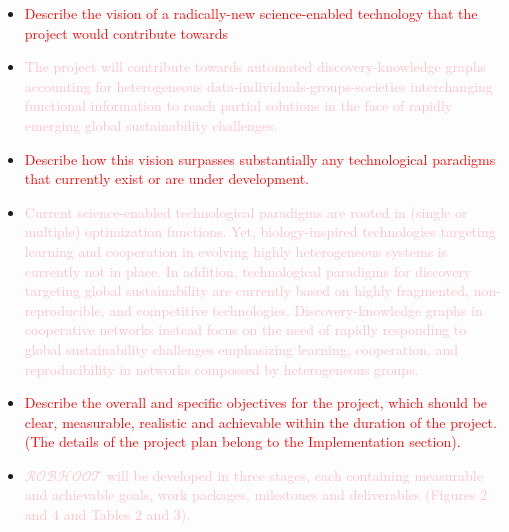 \documentclass[11pt, a4paper]{article} %
\begin{document}
\begin{itemize}
\item \textcolor{red}{Describe the vision of a radically-new
    science-enabled technology that the project would contribute
    towards}
\item \textcolor{pink}{The project will contribute towards automated
    discovery-knowledge graphs accounting for heterogeneous
    data-individuals-groups-societies interchanging functional
    information to reach partial solutions in the face of rapidly
    emerging global sustainability challenges.}
\item \textcolor{red}{Describe how this vision surpasses substantially
    any technological paradigms that currently exist or are under
    development.}
\item \textcolor{pink}{Current science-enabled technological paradigms
    are rooted in (single or multiple) optimization functions. Yet,
    biology-inspired technologies targeting learning and cooperation
    in evolving highly heterogeneous systems is currently not in
    place. In addition, technological paradigms for discovery
    targeting global sustainability are currently based on highly
    fragmented, non-reproducible, and competitive
    technologies. Discovery-knowledge graphs in cooperative networks
    instead focus on the need of rapidly responding to global
    sustainability challenges emphasizing learning, cooperation, and
    reproducibility in networks compossed by heterogeneous groups.}
\item \textcolor{red}{Describe the overall and specific objectives for
    the project, which should be clear, measurable, realistic and
    achievable within the duration of the project. (The details of the
    project plan belong to the Implementation section).}
\item \textcolor{pink}{$\mathcal{ROBHOOT}$ will be developed in three
    stages, each containing measurable and achievable goals, work
    packages, milestones and deliverables (Figures 2 and 4 and Tables
    2 and 3).}
\end{itemize}
\end{document}
